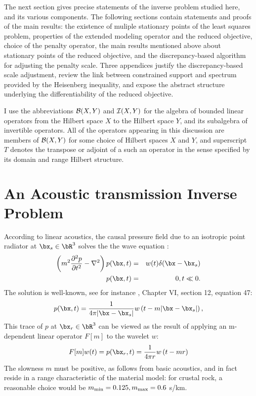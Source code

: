 The next section gives precise statements of the inverse problem
studied here, and its various components. The following sections
contain statements and proofs of the main results: the existence of
muliple stationary points of the least squares problem, properties of
the extended modeling operator and the reduced objective, choice of
the penalty operator, the main results mentioned above about
stationary points of the reduced objective, and the discrepancy-based
algorithm for adjusting the penalty scale. Three appendices justify
the discrepancy-based scale adjustment, review the link between
constrained support and spectrum provided by the Heisenberg inequality,
and expose the abstract structure underlying the differentiability of
the reduced objective.
  
I use the abbreviations ${\cal B}(X,Y)$ and ${\cal I}(X,Y)$ for 
the algebra of bounded linear operators from the Hilbert space $X$ to 
the Hilbert space $Y$, and its subalgebra of invertible
operators. All of the operators appearing in this discussion are
members of ${\cal B}(X,Y)$ for some choice of Hilbert spaces $X$ and
$Y$, and superscript $T$ denotes the transpose or adjoint of a such an
operator in the sense specified by its domain and range Hilbert structure.

\section{An Acoustic transmission Inverse Problem}
According to linear acoustics, the causal pressure field due to an
isotropic point radiator at $\bx_s \in \bR^3$ 
solves the the wave equation \cite[]{Frie:58}:
\begin{eqnarray}
  \label{eqn:awe}
  \left(m^2\frac{\partial^2 p}{\partial t^2} - \nabla^2\right) p(\bx,t) &=&
                                                                         w(t)\delta(\bx-\bx_s) \nonumber\\
  p(\bx,t)&=&0, t\ll 0.
\end{eqnarray}
The solution is well-known, see for instance
\cite{CourHil:62}, Chapter VI, section 12, equation 47:
\begin{equation}
  \label{eqn:homsol}
  p(\bx,t) = \frac{1}{4\pi |\bx-\bx_s|}w\left(t-m|\bx-\bx_s|\right),
\end{equation}
This trace of $p$ at $\bx_r \in \bR^3$ can be viewed as the result of
applying an m-dependent linear operator $F[m]$ to the wavelet $w$:
\begin{equation}
\label{eqn:mod}
F[m]w(t)  = p(\bx_r,t) = \frac{1}{4\pi r}w\left(t-mr\right) 
\end{equation}
The slowness $m$ must be positive, as follows from basic acoustics,
and in fact reside in a range characteristic of the
material model: for crustal rock, a reasonable choice would be
$m_{\rm min}=0.125, m_{\rm max}=0.6$ s/km.

